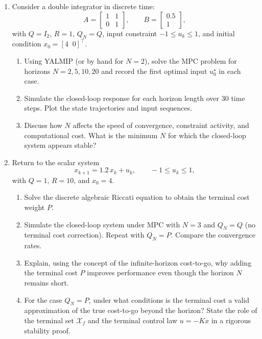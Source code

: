 \begin{enumerate}
\item Consider a double integrator in discrete time:
\[
A = \begin{bmatrix} 1 & 1 \\ 0 & 1 \end{bmatrix}, \qquad B = \begin{bmatrix} 0.5 \\ 1 \end{bmatrix},
\]
with $Q = I_2$, $R = 1$, $Q_N = Q$, input constraint $-1 \le u_k \le 1$, and initial condition $x_0 = [4 \;\; 0]^\top$.
\begin{enumerate}
	\item Using YALMIP (or by hand for $N = 2$), solve the MPC problem for horizons $N = 2, 5, 10, 20$ and record the first optimal input $u_0^\star$ in each case.
	\item Simulate the closed-loop response for each horizon length over $30$ time steps. Plot the state trajectories and input sequences.
	\item Discuss how $N$ affects the speed of convergence, constraint activity, and computational cost. What is the minimum $N$ for which the closed-loop system appears stable?
\end{enumerate}

\item Return to the scalar system
\[
x_{k+1} = 1.2\, x_k + u_k, \qquad -1 \le u_k \le 1,
\]
with $Q = 1$, $R = 10$, and $x_0 = 4$.
\begin{enumerate}
	\item Solve the discrete algebraic Riccati equation to obtain the terminal cost weight $P$.
	\item Simulate the closed-loop system under MPC with $N = 3$ and $Q_N = Q$ (no terminal cost correction). Repeat with $Q_N = P$. Compare the convergence rates.
	\item Explain, using the concept of the infinite-horizon cost-to-go, why adding the terminal cost $P$ improves performance even though the horizon $N$ remains short.
	\item For the case $Q_N = P$, under what conditions is the terminal cost a valid approximation of the true cost-to-go beyond the horizon? State the role of the terminal set $\mathcal{X}_f$ and the terminal control law $u = -Kx$ in a rigorous stability proof.
\end{enumerate}


\end{enumerate}
